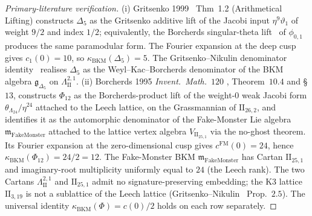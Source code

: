 \begin{proof}[Primary-literature verification]
(i) Gritsenko 1999~\cite{Gritsenko1999} Thm~1.2 (Arithmetical
Lifting) constructs $\Delta_5$ as the Gritsenko additive lift of the
Jacobi input $\eta^9\vartheta_1$ of weight $9/2$ and index $1/2$;
equivalently, the Borcherds singular-theta lift~\cite{Bor95}
of $\phi_{0,1}$ produces the same paramodular form. The Fourier
expansion at the deep cusp gives $c_1(0) = 10$, so
$\kappa_{\mathrm{BKM}}(\Delta_5) = 5$. The Gritsenko--Nikulin
denominator identity~\cite{GritsenkoNikulin1998} realises $\Delta_5$
as the Weyl--Kac--Borcherds denominator of the BKM algebra
$\mathfrak g_{\Delta_5}$ on
$\Lambda^{2,1}_{\mathrm{II}}$.
(ii) Borcherds 1995 \emph{Invent.~Math.}~$120$
\cite{Bor95}, Theorem~$10.4$ and \S $13$, constructs $\Phi_{12}$ as
the Borcherds-product lift of the weight-$0$ weak Jacobi form
$\theta_{\Lambda_{24}}/\eta^{24}$ attached to the Leech lattice, on
the Grassmannian of $\mathrm{II}_{26,2}$, and identifies it as the
automorphic denominator of the Fake-Monster Lie algebra
$\mathfrak m_{\mathrm{FakeMonster}}$ attached to the lattice vertex
algebra $V_{\mathrm{II}_{25,1}}$ via the no-ghost theorem. Its Fourier
expansion at the zero-dimensional cusp gives
$c^{\mathrm{FM}}(0) = 24$, hence
$\kappa_{\mathrm{BKM}}(\Phi_{12}) = 24/2 = 12$. The Fake-Monster BKM
$\mathfrak m_{\mathrm{FakeMonster}}$ has Cartan $\mathrm{II}_{25,1}$
and imaginary-root multiplicity uniformly equal to $24$ (the Leech
rank). The two Cartans $\Lambda^{2,1}_{\mathrm{II}}$ and
$\mathrm{II}_{25,1}$ admit no signature-preserving embedding; the
K3 lattice $\mathrm{II}_{3,19}$ is not a sublattice of the Leech
lattice (Gritsenko--Nikulin~\cite{GritsenkoNikulin1998} Prop.~$2.5$).
The universal identity
$\kappa_{\mathrm{BKM}}(\Phi) = c(0)/2$ holds on each row separately.
\end{proof}

